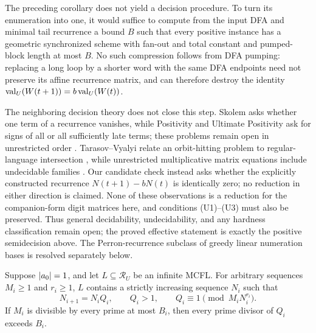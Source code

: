 \begin{remark}
  \label{rem:general-decision-interface}
  The preceding corollary does not yield a decision procedure. To turn
  its enumeration into one, it would suffice to compute from the input
  DFA and minimal tail recurrence a bound \(B\) such that every positive
  instance has a geometric synchronized scheme with fan-out and total
  constant and pumped-block length at most \(B\). No such compression
  follows from DFA pumping: replacing a long loop by a shorter word with
  the same DFA endpoints need not preserve its affine recurrence matrix,
  and can therefore destroy the identity
  \(\operatorname{val}_U(W(t+1))=b\operatorname{val}_U(W(t))\).

  The neighboring decision theory does not close this step. Skolem asks
  whether one term of a recurrence vanishes, while Positivity and Ultimate
  Positivity ask for signs of all or all sufficiently late terms; these
  problems remain open in unrestricted order
  \cite{OuaknineWorrell2012,AkshayBazilleGenestVahanwala2024}.
  Tarasov--Vyalyi relate an orbit-hitting problem to regular-language
  intersection \cite{TarasovVyalyi2011}, while unrestricted multiplicative
  matrix equations include undecidable families
  \cite{BellEtAl2008MatrixEquations}. Our candidate check instead asks
  whether the explicitly constructed recurrence
  \(N(t+1)-bN(t)\) is identically zero; no reduction in either direction is
  claimed. None of these observations is a reduction for the companion-form
  digit matrices here, and conditions
  \textup{(U1)--(U3)} must also be preserved. Thus general decidability,
  undecidability, and any hardness classification remain open; the proved
  effective statement is exactly the positive semidecision above. The
  Perron-recurrence subclass of greedy linear numeration bases is resolved
  separately below.
\end{remark}

\begin{theorem}
  \label{thm:unit-mcfl-deep-congruence-chain}
  Suppose \(\lvert a_0 \rvert=1\), and let \(L\subseteq\mathcal R_U\) be an
  infinite MCFL. For arbitrary sequences \(M_i\ge1\) and \(r_i\ge1\),
  \(L\) contains a strictly increasing sequence \(N_i\) such that
  \[
    N_{i+1}=N_iQ_i,\qquad Q_i>1,\qquad
    Q_i\equiv1\pmod {M_iN_i^{r_i}}.
  \]
  If \(M_i\) is divisible by every prime at most \(B_i\), then every
  prime divisor of \(Q_i\) exceeds \(B_i\).
\end{theorem}

